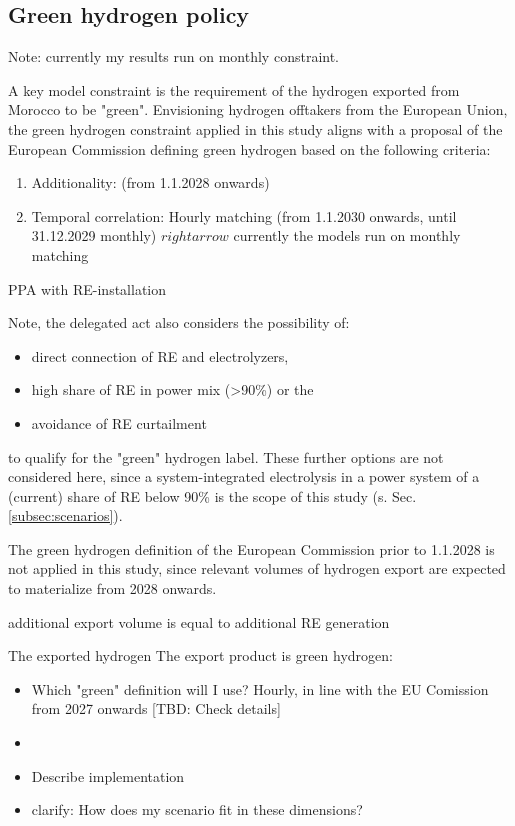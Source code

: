 \subsection{Green hydrogen policy}
\label{subsubsec:green_hydrogen_constraint}

Note: currently my results run on monthly constraint.

A key model constraint is the requirement of the hydrogen exported from Morocco to be "green". Envisioning hydrogen offtakers from the European Union, the green hydrogen constraint applied in this study aligns with a proposal of the European Commission defining green hydrogen  based on the following criteria:


\begin{enumerate}
    \item Additionality: (from 1.1.2028 onwards)
    \item Temporal correlation: Hourly matching (from 1.1.2030 onwards, until 31.12.2029 monthly) $rightarrow$ currently the models run on monthly matching
\end{enumerate}


PPA with RE-installation


Note, the delegated act also considers the possibility of:
\begin{itemize}
    \item direct connection of RE and electrolyzers,
    \item high share of RE in power mix (>90\%) or the 
    \item avoidance of RE curtailment
\end{itemize}
to qualify for the "green" hydrogen label. These further options are not considered here, since a system-integrated electrolysis in a power system of a (current) share of RE below 90\% is the scope of this study (s. Sec. \ref{subsec:scenarios}).



The green hydrogen definition of the European Commission prior to 1.1.2028 is not applied in this study, since relevant volumes of hydrogen export are expected to materialize from 2028 onwards.


additional export volume is equal to additional RE generation

The exported hydrogen 
The export product is green hydrogen:
\begin{itemize}
    \item Which "green" definition will I use? Hourly, in line with the EU Comission from 2027 onwards [TBD: Check details]
    \item 
    \item Describe implementation
    \item clarify: How does my scenario fit in these dimensions?
\end{itemize}

